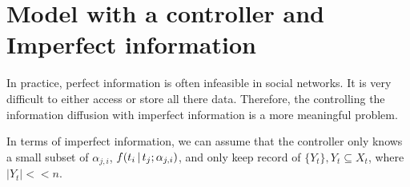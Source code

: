 \documentclass[11pt]{article}
\begin{document}
\section{Model with a controller and Imperfect information}
In practice, perfect information is often infeasible in social networks. It is very difficult to either access or store all there data. Therefore, the controlling the information diffusion with imperfect information is a more meaningful problem.

In terms of imperfect information, we can assume that the controller only knows a small subset of $\alpha_{j,i}$, $f(t_{i}\,|\, t_{j} ; \alpha_{j,i})$, and only keep record of $\{Y_{t}\}, Y_{t} \subseteq X_{t}$, where $|Y_{t}| <<n$.
\end{document}
